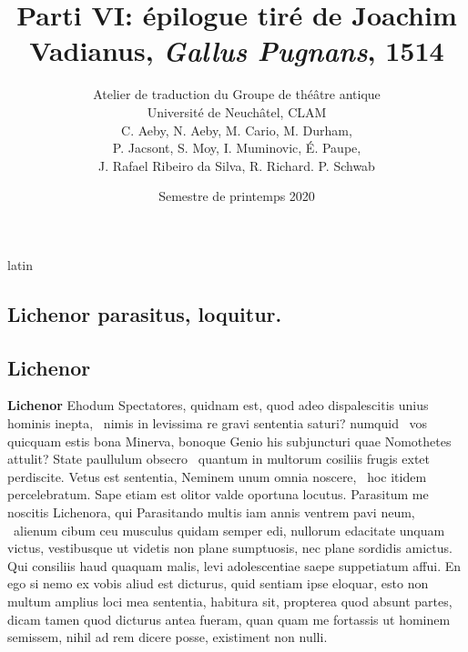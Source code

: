 \documentclass[12pt]{book}
\renewenvironment{latin}
    	{\begin{hyphenrules}{latin}}
    	{\end{hyphenrules}}
\begin{document}
        \title{Parti VI: épilogue tiré de Joachim Vadianus, \textit{Gallus Pugnans}, 1514}
        \author{Atelier de traduction du Groupe de théâtre antique\\
            Université de Neuchâtel, CLAM\\
            C. Aeby, N. Aeby, M. Cario, M. Durham,\\ 
            P. Jacsont, S. Moy, I. Muminovic, É. Paupe,\\
            J. Rafael Ribeiro da Silva, R. Richard. P. Schwab}
        \date{Semestre de printemps 2020}
        
        \maketitle
        \begin{pages}
        \begin{latin}
        \begin{Leftside}
        \beginnumbering 
            \pstart\section*{Lichenor parasitus, loquitur.}\pend\pstart\subsection*{Lichenor}\pend\pstart\textbf{Lichenor}\hspace{1cm} 
                    Ehodum Spectatores, quidnam est, quod adeo dispalescitis unius hominis inepta, ﻿\ampersand\ nimis in levissima re gravi sententia saturi? 
                    numquid ﻿\ampersand\ vos quicquam estis bona Minerva, bonoque Genio his subjuncturi quae Nomothetes attulit? 
                    State paullulum   obsecro ﻿\ampersand\ quantum in multorum cosiliis frugis extet perdiscite. 
                    Vetus est sententia, Neminem unum omnia noscere, ﻿\ampersand\ hoc itidem percelebratum. 
                    Sape etiam est olitor valde oportuna locutus. 
                    Parasitum me noscitis Lichenora, qui Parasitando multis iam annis ventrem pavi neum, ﻿\ampersand\ alienum cibum ceu musculus quidam semper edi, nullorum edacitate unquam victus, vestibusque ut videtis non plane sumptuosis, nec plane sordidis amictus. 
                    Qui consiliis haud quaquam malis, levi adolescentiae saepe suppetiatum affui. 
                    En ego si nemo ex vobis aliud est dicturus, quid sentiam ipse eloquar, esto non multum amplius loci mea sententia, habitura sit, propterea quod absunt partes, dicam tamen quod dicturus antea fueram, quan quam me fortassis ut hominem semissem, nihil ad rem dicere posse, existiment non nulli. 

\end{Leftside}
\end{latin}
\end{pages}
\end{document}
